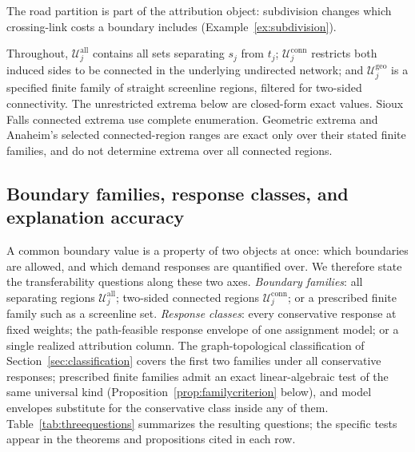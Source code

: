 \documentclass[a4paper,fleqn]{cas-sc}
\begin{document}
The road partition is part of the attribution object: subdivision changes
which crossing-link costs a boundary includes (Example~\ref{ex:subdivision}).

Throughout, $\mathcal U_j^{\mathrm{all}}$ contains all sets separating
$s_j$ from $t_j$; $\mathcal U_j^{\mathrm{conn}}$ restricts both induced sides
to be connected in the underlying undirected network; and
$\mathcal U_j^{\mathrm{geo}}$ is a specified finite family of straight
screenline regions, filtered for two-sided connectivity.
The unrestricted extrema below are closed-form exact values. Sioux Falls
connected extrema use complete enumeration. Geometric extrema and Anaheim's
selected connected-region ranges are exact only over their stated finite
families, and do not determine extrema over all connected regions.

\subsection{Boundary families, response classes, and explanation accuracy}\label{sec:levels}\label{sec:hierarchy}
A common boundary value is a property of two objects at once: which
boundaries are allowed, and which demand responses are quantified over.
We therefore state the transferability questions along these two axes.
\emph{Boundary families}: all separating regions
$\mathcal U_j^{\mathrm{all}}$; two-sided connected regions
$\mathcal U_j^{\mathrm{conn}}$; or a prescribed finite family such as a
screenline set. \emph{Response classes}: every conservative response at
fixed weights; the path-feasible response envelope of one assignment model;
or a single realized attribution column. The graph-topological
classification of Section~\ref{sec:classification} covers the first two
families under all conservative responses; prescribed finite families
admit an exact linear-algebraic test of the same universal kind
(Proposition~\ref{prop:familycriterion} below), and model envelopes
substitute for the conservative class inside any of them.
Table~\ref{tab:threequestions} summarizes the resulting questions; the
specific tests appear in the theorems and propositions cited in each
row.
\end{document}
